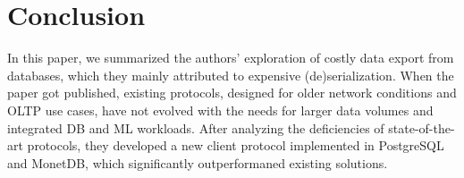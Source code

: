 \documentclass[sigconf]{acmart}
\begin{document}
\section{Conclusion}
In this paper, we summarized the authors’ exploration of costly data export from databases, which they mainly attributed to expensive (de)serialization. When the paper got published, existing protocols, designed for older network conditions and OLTP use cases, have not evolved with the needs for larger data volumes and integrated DB and ML workloads. After analyzing the deficiencies of state-of-the-art protocols, they developed a new client protocol implemented in PostgreSQL and MonetDB, which significantly outperformaned existing solutions. 



\end{document}
